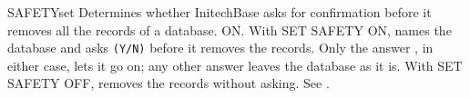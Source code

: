\begin{XbaseEntry}{SAFETY}{set}
Determines whether InitechBase asks for confirmation before it removes all
the records of a database.
\Syntax
{}
\Defaults
ON.
\Usage
With SET SAFETY ON,  names the database and asks \texttt{(Y/N)}
before it removes the records.  Only the answer , in either case,
lets it go on; any other answer leaves the database as it is.  With SET
SAFETY OFF,  removes the records without asking.
\Examples
See .
\end{XbaseEntry}

